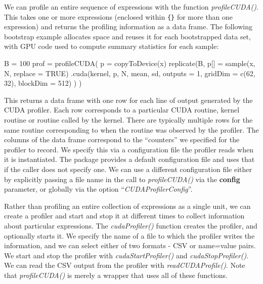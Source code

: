\documentclass[article]{jss}
\def\R{\proglang{R}}
\def\Rpkg#1{\pkg{#1}}
\def\Rfunc#1{\textsl{#1()}}
\def\Rarg#1{\textbf{#1}}
\def\Roption#1{\dquote{\textsl{#1}}}
\def\dquote#1{``#1''}
\begin{document}

We can profile an entire sequence of \R{} expressions with the \R{}
function \Rfunc{profileCUDA}.  This takes one or more \R{} expressions
(enclosed within \texttt{\{\}} for more than one expression) and returns the
profiling information as a data frame.
The following bootstrap example allocates space and reuses it for each
bootstrapped data set, with GPU code used to compute summary statistics 
for each sample:  
\begin{RCode}
B = 100
prof = profileCUDA( {
  p = copyToDevice(x)
  replicate(B, {
      p[] = sample(x, N, replace = TRUE)
      .cuda(kernel, p, N, mean, sd, outputs = 1,  
                   gridDim = c(62, 32), blockDim = 512)
  })
})
\end{RCode}
This returns a data frame with one row for each line of output generated
by the CUDA profiler.  Each row corresponds to a particular CUDA
routine, kernel routine or routine called by the kernel.  There are
typically multiple rows for the same routine corresponding to when the
routine was observed by the profiler.  The columns of the data frame
correspond to the \dquote{counters} we specified for the profiler to
record.  We specify this via a configuration file the profiler reads
when it is instantiated. The \Rpkg{RCUDA} package provides a default
configuration file and uses that if the caller does not specify one.
We can use a different configuration file either by explicitly passing
a file name in the call to \Rfunc{profileCUDA} via the \Rarg{config}
parameter, or globally via the \R{} option
\Roption{CUDAProfilerConfig}.


Rather than profiling an entire collection of \R{} expressions as a
single unit, we can create a profiler and start and stop it at
different times to collect information about particular \R{}
expressions.  The \Rfunc{cudaProfiler} function creates the profiler,
and optionally starts it.  We specify the name of a file to which the
profiler writes the information, and we can select either of two
formats - CSV or name=value pairs.  We start and stop the profiler
with \Rfunc{cudaStartProfiler} and \Rfunc{cudaStopProfiler}.  We can
read the CSV output from the profiler with \Rfunc{readCUDAProfile}.
Note that \Rfunc{profileCUDA} is merely a wrapper that uses all of these
functions.
\end{document}
